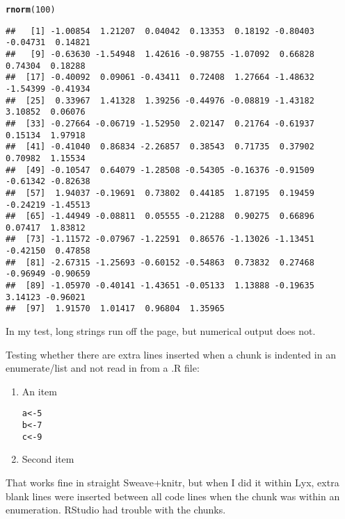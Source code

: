 \documentclass{article}\usepackage{graphicx, color}
\makeatletter
\newcommand{\hlfunctioncall}[1]{\textcolor[rgb]{0.501960784313725,0,0.329411764705882}{\textbf{#1}}}%
\newenvironment{kframe}{%
 \def\at@end@of@kframe{}%
 \ifinner\ifhmode%
  \def\at@end@of@kframe{\end{minipage}}%
  \begin{minipage}{\columnwidth}%
 \fi\fi%
 \def\FrameCommand##1{\hskip\@totalleftmargin \hskip-\fboxsep
 \colorbox{shadecolor}{##1}\hskip-\fboxsep
     \hskip-\linewidth \hskip-\@totalleftmargin \hskip\columnwidth}%
 \MakeFramed {\advance\hsize-\width
   \@totalleftmargin\z@ \linewidth\hsize
   \@setminipage}}%
 {\par\unskip\endMakeFramed%
 \at@end@of@kframe}
\newenvironment{knitrout}{}{} %
\makeatother
\begin{document}
\begin{knitrout}
\begin{kframe}
\begin{alltt}
\hlfunctioncall{rnorm}(100)
\end{alltt}
\begin{verbatim}
##   [1] -1.00854  1.21207  0.04042  0.13353  0.18192 -0.80403 -0.04731  0.14821
##   [9] -0.63630 -1.54948  1.42616 -0.98755 -1.07092  0.66828  0.74304  0.18288
##  [17] -0.40092  0.09061 -0.43411  0.72408  1.27664 -1.48632 -1.54399 -0.41934
##  [25]  0.33967  1.41328  1.39256 -0.44976 -0.08819 -1.43182  3.10852  0.06076
##  [33] -0.27664 -0.06719 -1.52950  2.02147  0.21764 -0.61937  0.15134  1.97918
##  [41] -0.41040  0.86834 -2.26857  0.38543  0.71735  0.37902  0.70982  1.15534
##  [49] -0.10547  0.64079 -1.28508 -0.54305 -0.16376 -0.91509 -0.61342 -0.82638
##  [57]  1.94037 -0.19691  0.73802  0.44185  1.87195  0.19459 -0.24219 -1.45513
##  [65] -1.44949 -0.08811  0.05555 -0.21288  0.90275  0.66896  0.07417  1.83812
##  [73] -1.11572 -0.07967 -1.22591  0.86576 -1.13026 -1.13451 -0.42150  0.47858
##  [81] -2.67315 -1.25693 -0.60152 -0.54863  0.73832  0.27468 -0.96949 -0.90659
##  [89] -1.05970 -0.40141 -1.43651 -0.05133  1.13888 -0.19635  3.14123 -0.96021
##  [97]  1.91570  1.01417  0.96804  1.35965
\end{verbatim}
\end{kframe}
\end{knitrout}


In my test, long strings run off the page, but numerical output does not.


Testing whether there are extra lines inserted when a chunk is indented in an enumerate/list and not read in from a .R file:

\begin{enumerate}
  
\item An item
    
\begin{knitrout}
\color{fgcolor}\begin{kframe}
\begin{alltt}
a <- 5
b <- 7
c <- 9
\end{alltt}
\end{kframe}
\end{knitrout}

    
\item Second item
  
\end{enumerate}  
  
That works fine in straight Sweave+knitr, but when I did it within Lyx, extra blank lines were inserted between all code lines when the chunk was within an enumeration. RStudio had trouble with the chunks.
\end{document}
